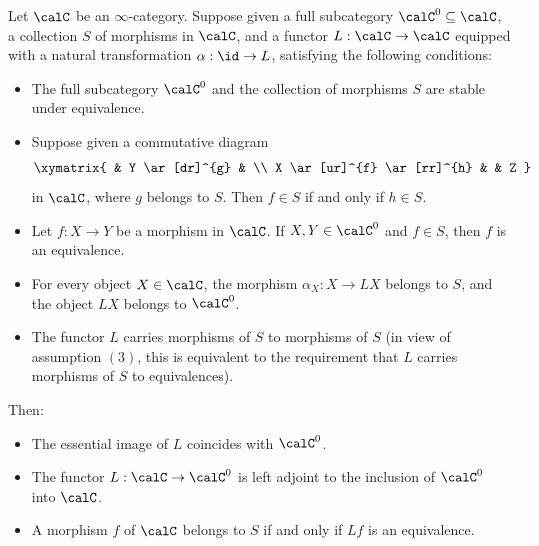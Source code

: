 \begin{proposition}\label{genprip}
Let $\calC$ be an $\infty$-category. Suppose given a full subcategory $\calC^{0} \subseteq \calC$,
a collection $S$ of morphisms in $\calC$, and a functor $L: \calC \rightarrow \calC$ equipped with
a natural transformation $\alpha: \id \rightarrow L$, satisfying the following conditions:
\begin{itemize}
\item[$(1)$] The full subcategory $\calC^0$ and the collection of morphisms $S$ are stable under equivalence.
\item[$(2)$] Suppose given a commutative diagram
$$ \xymatrix{ & Y \ar[dr]^{g} & \\
X \ar[ur]^{f} \ar[rr]^{h} & & Z }$$
in $\calC$, where $g$ belongs to $S$. Then $f \in S$ if and only if $h \in S$.
\item[$(3)$] Let $f: X \rightarrow Y$ be a morphism in $\calC$. If $X,Y \in \calC^0$ and $f \in S$, then $f$ is an equivalence.
\item[$(4)$] For every object $X \in \calC$, the morphism $\alpha_{X}: X \rightarrow LX$ belongs to
$S$, and the object $LX$ belongs to $\calC^0$.
\item[$(5)$] The functor $L$ carries morphisms of $S$ to morphisms of $S$ (in view of assumption
$(3)$, this is equivalent to the requirement that $L$ carries morphisms of $S$ to equivalences).
\end{itemize}
Then:
\begin{itemize}
\item[$(a)$] The essential image of $L$ coincides with $\calC^0$.
\item[$(b)$] The functor $L: \calC \rightarrow \calC^0$ is left adjoint to the inclusion of
$\calC^0$ into $\calC$.
\item[$(c)$] A morphism $f$ of $\calC$ belongs to $S$ if and only if $Lf$ is an equivalence.
\end{itemize}
\end{proposition}

